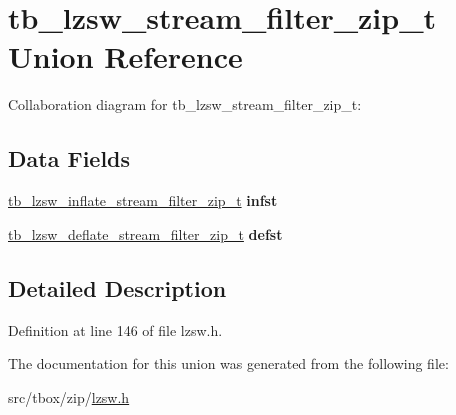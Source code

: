 \hypertarget{uniontb__lzsw__stream__filter__zip__t}{\section{tb\-\_\-lzsw\-\_\-stream\-\_\-filter\-\_\-zip\-\_\-t Union Reference}
\label{uniontb__lzsw__stream__filter__zip__t}
}


Collaboration diagram for tb\-\_\-lzsw\-\_\-stream\-\_\-filter\-\_\-zip\-\_\-t\-:
\subsection*{Data Fields}
\begin{DoxyCompactItemize}
\item 
\hypertarget{uniontb__lzsw__stream__filter__zip__t_a64bdafa1f8d4552026d99291ea2023cf}{\hyperlink{structtb__lzsw__inflate__stream__filter__zip__t}{tb\-\_\-lzsw\-\_\-inflate\-\_\-stream\-\_\-filter\-\_\-zip\-\_\-t} {\bfseries infst}}\label{uniontb__lzsw__stream__filter__zip__t_a64bdafa1f8d4552026d99291ea2023cf}

\item 
\hypertarget{uniontb__lzsw__stream__filter__zip__t_ad07cc98ab47a8bb352c3021e9cf9fb93}{\hyperlink{structtb__lzsw__deflate__stream__filter__zip__t}{tb\-\_\-lzsw\-\_\-deflate\-\_\-stream\-\_\-filter\-\_\-zip\-\_\-t} {\bfseries defst}}\label{uniontb__lzsw__stream__filter__zip__t_ad07cc98ab47a8bb352c3021e9cf9fb93}

\end{DoxyCompactItemize}


\subsection{Detailed Description}


Definition at line 146 of file lzsw.\-h.



The documentation for this union was generated from the following file\-:\begin{DoxyCompactItemize}
\item 
src/tbox/zip/\hyperlink{lzsw_8h}{lzsw.\-h}\end{DoxyCompactItemize}
